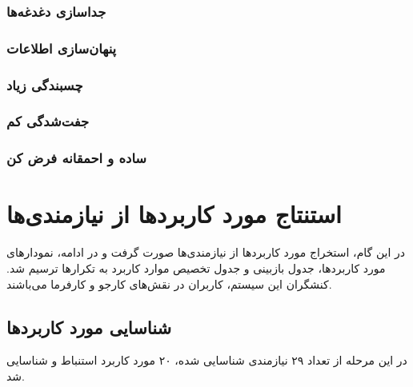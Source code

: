 \documentclass[12pt,svgnames,oneside]{book}
\begin{document}
			\subsection{جداسازی دغدغه‌ها}
			\subsection{پنهان‌سازی اطلاعات}
			\subsection{چسبندگی زیاد}
			\subsection{جفت‌شدگی کم}
			\subsection{ساده و احمقانه فرض کن}
			
	\chapter{استنتاج مورد کاربرد‌ها از نیازمندی‌‌ها}
		در این گام، استخراج مورد کاربرد‌ها از نیازمندی‌ها صورت گرفت و در ادامه، نمودار‌‌های مورد کاربرد‌ها، جدول بازبینی و جدول تخصیص موارد کاربرد به تکرار‌‌ها ترسیم شد. کنشگران این سیستم، کاربران در نقش‌های کارجو و کارفرما می‌باشند.
		
		\section{شناسایی مورد کاربرد‌ها}
			در این مرحله از تعداد ۲۹ نیازمندی شناسایی شده، ۲۰ مورد کاربرد استنباط و شناسایی شد.
\end{document}
